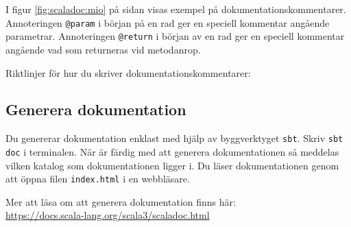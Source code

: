 I figur \ref{fig:scaladoc:mio} på sidan \pageref{fig:scaladoc:mio} visas exempel på dokumentationskommentarer. Annoteringen \verb|@param| i början på en rad ger en speciell kommentar angående parametrar. Annoteringen \verb|@return| i början av en rad ger en speciell kommentar angående vad som returneras vid metodanrop.

Riktlinjer för hur du skriver dokumentationskommentarer: \\

\subsection{Generera dokumentation}


Du genererar dokumentation enklast med hjälp av byggverktyget \texttt{sbt}. Skriv \texttt{sbt doc} i terminalen. När  är färdig med att generera dokumentationen så meddelas vilken katalog som dokumentationen ligger i. Du läser dokumentationen genom att öppna filen \texttt{index.html} i en webbläsare.

Mer att läsa om att generera dokumentation finns här: \\
\url{https://docs.scala-lang.org/scala3/scaladoc.html}





